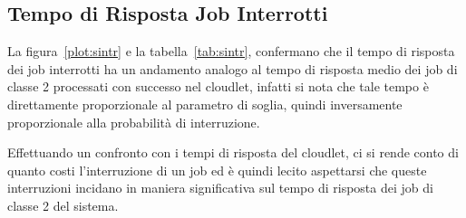 \subsection{Tempo di Risposta Job Interrotti}
La figura~\ref{plot:sintr} e la tabella~\ref{tab:sintr}, confermano che il tempo
di risposta dei job interrotti ha un andamento analogo al tempo di risposta
medio dei job di classe 2 processati con successo nel cloudlet, infatti si nota
che tale tempo è direttamente proporzionale al parametro di soglia, quindi
inversamente proporzionale alla probabilità di interruzione.

Effettuando un confronto con i tempi di risposta del cloudlet, ci si rende conto
di quanto costi l'interruzione di un job ed è quindi lecito aspettarsi che
queste interruzioni incidano in maniera significativa sul tempo di risposta dei
job di classe 2 del sistema.

